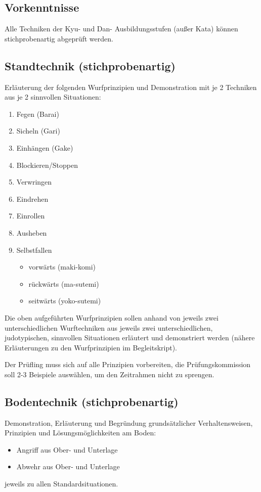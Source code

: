 \documentclass[justified, a4paper, notitlepage, captions=tableheading, nobib]{tufte-handout}
\begin{document}
\subsection{Vorkenntnisse}
\label{sec:org9747d53}
Alle Techniken der Kyu- und Dan- Ausbildungsstufen (außer Kata) können stichprobenartig abgeprüft werden.

\subsection{Standtechnik (stichprobenartig)}
\label{sec:orge0e119d}
Erläuterung der folgenden Wurfprinzipien und Demonstration mit je 2 Techniken aus je 2 sinnvollen Situationen:
\begin{enumerate}
\item Fegen (Barai)
\item Sicheln (Gari)
\item Einhängen (Gake)
\item Blockieren/Stoppen
\item Verwringen
\item Eindrehen
\item Einrollen
\item Ausheben
\item Selbstfallen
\begin{itemize}
\item vorwärts (maki-komi)
\item rückwärts (ma-sutemi)
\item seitwärts (yoko-sutemi)
\end{itemize}
\end{enumerate}

Die oben aufgeführten Wurfprinzipien sollen anhand von jeweils zwei unterschiedlichen Wurftechniken aus jeweils zwei unterschiedlichen, judotypischen, sinnvollen Situationen erläutert und demonstriert werden (nähere Erläuterungen zu den Wurfprinzipien im Begleitskript).

Der Prüfling muss sich auf alle Prinzipien vorbereiten, die Prüfungskommission soll 2-3 Beispiele auswählen, um den Zeitrahmen nicht zu sprengen.

\subsection{Bodentechnik (stichprobenartig)}
\label{sec:org5636ca8}
Demonstration, Erläuterung und Begründung grundsätzlicher Verhaltensweisen, Prinzipien und Lösungsmöglichkeiten am Boden:
\begin{itemize}
\item Angriff aus Ober- und Unterlage
\item Abwehr aus Ober- und Unterlage
\end{itemize}
jeweils zu allen Standardsituationen.
\end{document}
